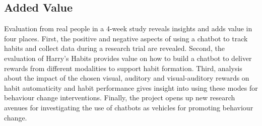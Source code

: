\subsection{Added Value}
Evaluation from real people in a 4-week study reveals insights and adds value in four places. First, the positive and negative aspects of using a chatbot to track habits and collect data during a research trial are revealed. Second, the evaluation of Harry's Habits provides value on how to build a chatbot to deliver rewards from different modalities to support habit formation. Third, analysis about the impact of the chosen visual, auditory and visual-auditory rewards on habit automaticity and habit performance gives insight into using these modes for behaviour change interventions. Finally, the project opens up new research avenues for investigating the use of chatbots as vehicles for promoting behaviour change.
\newpage
